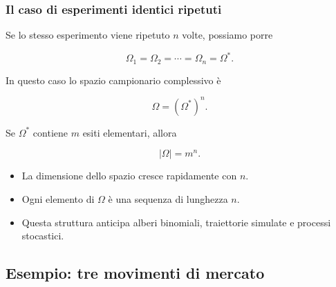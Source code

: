 \documentclass[handout]{beamer}%
\newenvironment{stepitemize}{\begin{itemize}[<+->]}{\end{itemize} }
\providecommand{\1}{\mathbf{1}}
\providecommand{\QTR}[2]{\csname #1\endcsname{#2}}
\begin{document}
\begin{frame}%
%

\frametitle{Il caso di esperimenti identici ripetuti}%


Se lo stesso esperimento viene ripetuto $n$ volte, possiamo porre%

\[
\Omega_{1}=\Omega_{2}=\cdots=\Omega_{n}=\Omega^{\ast}.
\]


\medskip

In questo caso lo spazio campionario complessivo \`{e}%

\[
\Omega=(\Omega^{\ast})^{n}.
\]


\medskip

Se $\Omega^{\ast}$ contiene $m$ esiti elementari, allora%

\[
|\Omega|=m^{n}.
\]


\medskip

\begin{stepitemize}
\item La dimensione dello spazio cresce rapidamente con $n$.

\item Ogni elemento di $\Omega$ \`{e} una sequenza di lunghezza $n$.

\item Questa struttura anticipa alberi binomiali, traiettorie simulate e
processi stocastici.
\end{stepitemize}%

\transboxout
\end{frame}%




\subsection{Esempio: tre movimenti di mercato}%
\end{document}
